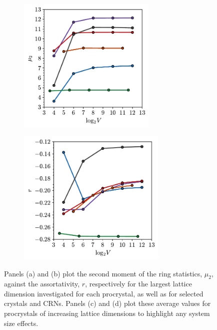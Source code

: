\begin{figure}[bt]
     \begin{subfigure}[b]{0.45\textwidth}
         \centering
         \includegraphics[height=6.5cm]{./figures/procrystals/pro3_ss_mu2.pdf}
         \caption{}
         \label{fig:pro3p6ssmu2}
     \end{subfigure}
     \hfill
        \begin{subfigure}[b]{0.45\textwidth}
         \centering
         \includegraphics[height=6.5cm]{./figures/procrystals/pro3_ss_r.pdf}
         \caption{}
         \label{fig:pro3p6ssr}
     \end{subfigure}
     
     \caption{Panels (a) and (b) plot the second moment of the ring statistics, $\mu_2$, against the assortativity, $r$, respectively for the largest lattice dimension investigated for each procrystal, as well as for selected crystals and CRNs. Panels (c) and (d) plot these average values for procrystals of increasing lattice dimensions to highlight any system size effects.}
     \label{fig:pro3p6mu2r}
\end{figure}

